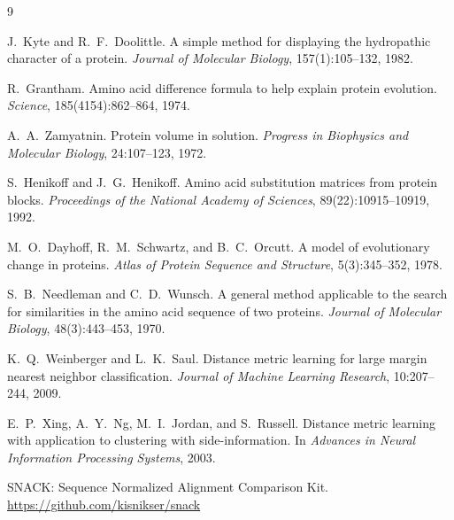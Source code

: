 \documentclass[12pt]{article}
\begin{document}
\begin{thebibliography}{9}

J.~Kyte and R.~F.~Doolittle.
\newblock A simple method for displaying the hydropathic character of a protein.
\newblock \emph{Journal of Molecular Biology}, 157(1):105--132, 1982.

R.~Grantham.
\newblock Amino acid difference formula to help explain protein evolution.
\newblock \emph{Science}, 185(4154):862--864, 1974.

A.~A.~Zamyatnin.
\newblock Protein volume in solution.
\newblock \emph{Progress in Biophysics and Molecular Biology}, 24:107--123, 1972.

S.~Henikoff and J.~G.~Henikoff.
\newblock Amino acid substitution matrices from protein blocks.
\newblock \emph{Proceedings of the National Academy of Sciences}, 89(22):10915--10919, 1992.

M.~O.~Dayhoff, R.~M.~Schwartz, and B.~C.~Orcutt.
\newblock A model of evolutionary change in proteins.
\newblock \emph{Atlas of Protein Sequence and Structure}, 5(3):345--352, 1978.

S.~B.~Needleman and C.~D.~Wunsch.
\newblock A general method applicable to the search for similarities in the amino acid sequence of two proteins.
\newblock \emph{Journal of Molecular Biology}, 48(3):443--453, 1970.

K.~Q.~Weinberger and L.~K.~Saul.
\newblock Distance metric learning for large margin nearest neighbor classification.
\newblock \emph{Journal of Machine Learning Research}, 10:207--244, 2009.

E.~P.~Xing, A.~Y.~Ng, M.~I.~Jordan, and S.~Russell.
\newblock Distance metric learning with application to clustering with side-information.
\newblock In \emph{Advances in Neural Information Processing Systems}, 2003.

SNACK: Sequence Normalized Alignment Comparison Kit.
\newblock \url{https://github.com/kisnikser/snack}

\end{thebibliography}
\end{document}
